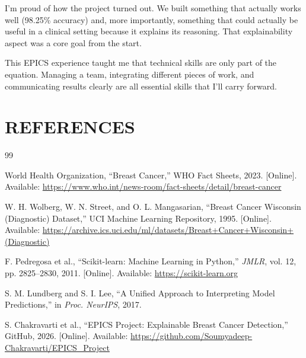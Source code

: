 \documentclass[12pt]{article}
\begin{document}
I'm proud of how the project turned out. We built something that actually works well (98.25\% accuracy) and, more importantly, something that could actually be useful in a clinical setting because it explains its reasoning. That explainability aspect was a core goal from the start.

This EPICS experience taught me that technical skills are only part of the equation. Managing a team, integrating different pieces of work, and communicating results clearly are all essential skills that I'll carry forward.

\newpage
\section{REFERENCES}

\begin{thebibliography}{99}

World Health Organization, ``Breast Cancer,'' WHO Fact Sheets, 2023. [Online]. Available: \url{https://www.who.int/news-room/fact-sheets/detail/breast-cancer}

W. H. Wolberg, W. N. Street, and O. L. Mangasarian, ``Breast Cancer Wisconsin (Diagnostic) Dataset,'' UCI Machine Learning Repository, 1995. [Online]. Available: \url{https://archive.ics.uci.edu/ml/datasets/Breast+Cancer+Wisconsin+(Diagnostic)}

F. Pedregosa et al., ``Scikit-learn: Machine Learning in Python,'' \textit{JMLR}, vol. 12, pp. 2825--2830, 2011. [Online]. Available: \url{https://scikit-learn.org}

S. M. Lundberg and S. I. Lee, ``A Unified Approach to Interpreting Model Predictions,'' in \textit{Proc. NeurIPS}, 2017.

S. Chakravarti et al., ``EPICS Project: Explainable Breast Cancer Detection,'' GitHub, 2026. [Online]. Available: \url{https://github.com/Soumyadeep-Chakravarti/EPICS_Project}

\end{thebibliography}
\end{document}
